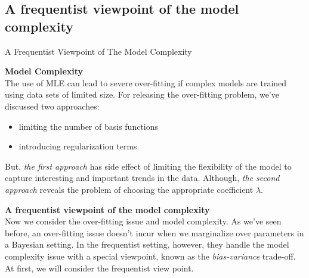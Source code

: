 \documentclass{bredelebeamer}
\begin{document}
\subsection{A frequentist viewpoint of the model complexity}
\begin{frame}{A Frequentist Viewpoint of The Model Complexity}
  \begin{justify}
    \textbf{Model Complexity}\\
    The use of MLE can lead to severe over-fitting if complex models are trained
    using data sets of limited size. For releasing the over-fitting problem, we've
    discussed two approaches:
    \begin{itemize}
      \item limiting the number of basis functions
      \item introducing regularization terms
    \end{itemize}
    But, \textit{the first approach} has side effect of limiting the flexibility
    of the model to capture interesting and important trends in the data. Although,
    \textit{the second approach} reveals the problem of choosing the appropriate
    coefficient $\lambda$.

    \vspace{0.5\baselineskip}
    \textbf{A frequentist viewpoint of the model complexity}\\
    Now we consider the over-fitting issue and model complexity. As we've seen
    before, an over-fitting issue doesn't incur when we marginalize over parameters
    in a Bayesian setting. In the frequentist setting, however, they handle the
    model complexity issue with a special viewpoint, known as the \textit{bias-variance}
    trade-off. At first, we will consider the frequentist view point.
  \end{justify}
\end{frame}
\end{document}
